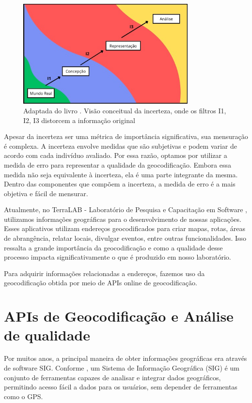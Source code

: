 \begin{figure}[ht]
   \centering
   \includegraphics[width=0.8\textwidth]{Figuras/incertezaMeu.jpeg}
   \caption{Adaptada do livro \cite{longley2013}. Visão conceitual da incerteza, onde os filtros I1, I2, I3 distorcem a informação original}
   \label{fig:incerteza}
\end{figure}

Apesar da incerteza ser uma métrica de importância significativa, sua mensuração é complexa. A incerteza envolve medidas que são subjetivas e podem variar de acordo com cada indivíduo avaliado. Por essa razão, optamos por utilizar a medida de erro para representar a qualidade da geocodificação. Embora essa medida não seja equivalente à incerteza, ela é uma parte integrante da mesma. Dentro das componentes que compõem a incerteza, a medida de erro é a mais objetiva e fácil de mensurar.

Atualmente, no TerraLAB - Laboratório de Pesquisa e Capacitação em Software \cite{terralab}, utilizamos informações geográficas para o desenvolvimento de nossas aplicações. Esses aplicativos utilizam endereços geocodificados para criar mapas, rotas, áreas de abrangência, relatar locais, divulgar eventos, entre outras funcionalidades. Isso ressalta a grande importância da geocodificação e como a qualidade desse processo impacta significativamente o que é produzido em nosso laboratório.

Para adquirir informações relacionadas a endereços, fazemos uso da geocodificação obtida por meio de APIs online de geocodificação.

\section{APIs de Geocodificação e Análise de qualidade}

Por muitos anos, a principal maneira de obter informações geográficas era através de software SIG. Conforme \cite{stein2021geoprocessamento}, um Sistema de Informação Geográfica (SIG) é um conjunto de ferramentas capazes de analisar e integrar dados geográficos, permitindo acesso fácil a dados para os usuários, sem depender de ferramentas como o GPS.

